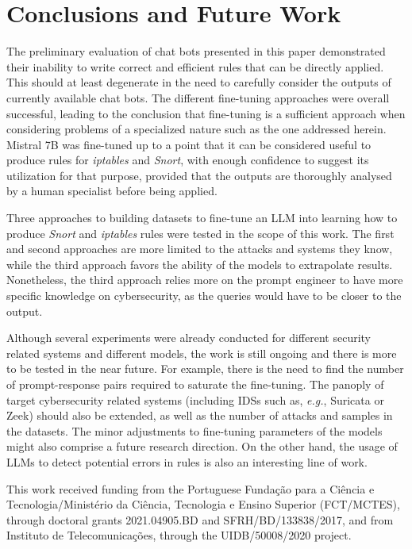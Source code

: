 \documentclass[sigconf]{acmart}
\begin{document}
\section{Conclusions and Future Work}
The preliminary evaluation of chat bots presented in this paper demonstrated their inability to write correct and efficient rules that can be directly applied. This should at least degenerate in the need to carefully consider the outputs of currently available chat bots. The different fine-tuning approaches were overall successful, leading to the conclusion that fine-tuning is a sufficient approach when considering problems of a specialized nature such as the one addressed herein. Mistral 7B was fine-tuned up to a point that it can be considered useful to produce rules for \textit{iptables} and \textit{Snort}, with enough confidence to suggest its utilization for that purpose, provided that the outputs are thoroughly analysed by a human specialist before being applied.

Three approaches to building datasets to fine-tune an LLM into learning how to produce \textit{Snort} and \textit{iptables} rules were tested in the scope of this work. The first and second approaches are more limited to the attacks and systems they know, while the third approach favors the ability of the models to extrapolate results. Nonetheless, the third approach relies more on the prompt engineer to have more specific knowledge on cybersecurity, as the queries would have to be closer to the output.

Although several experiments were already conducted for different security related systems and different models, the work is still ongoing and there is more to be tested in the near future. For example, there is the need to find the number of prompt-response pairs required to saturate the fine-tuning. The panoply of target cybersecurity related systems (including IDSs such as, \textit{e.g.}, Suricata or Zeek) should also be extended, as well as the number of attacks and samples in the datasets. The minor adjustments to fine-tuning parameters of the models might also comprise a future research direction. On the other hand, the usage of LLMs to detect potential errors in rules is also an interesting line of work.

\begin{acks}
This work received funding from the Portuguese Fundação para a Ciência e Tecnologia/Ministério da Ciência, Tecnologia e Ensino Superior (FCT/MCTES), through doctoral grants 2021.04905.BD and SFRH/BD/133838/2017, and from Instituto de Telecomunicações, through the UIDB/50008/2020 project.
\end{acks}



\end{document}
